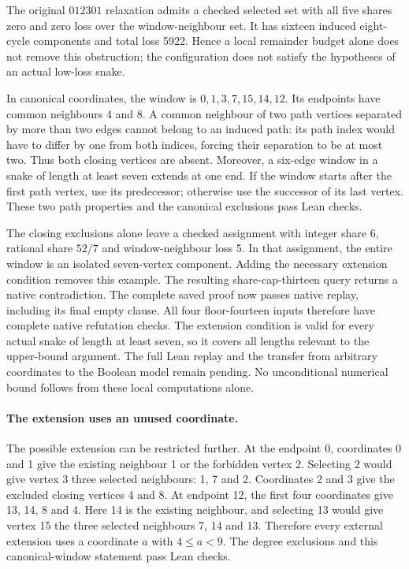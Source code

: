 \documentclass[11pt,a4paper]{article}
\theoremstyle{definition}
\theoremstyle{remark}
\begin{document}
The original $012301$ relaxation admits a checked selected set with all
five shares zero and zero loss over the window-neighbour set. It has
sixteen induced eight-cycle components and total loss 5922. Hence a
local remainder budget alone does not remove this obstruction; the
configuration does not satisfy the hypotheses of an actual low-loss snake.

In canonical coordinates, the window is $0,1,3,7,15,14,12$. Its endpoints
have common neighbours 4 and 8. A common neighbour of two path vertices
separated by more than two edges cannot belong to an induced path:
its path index would have to differ by one from both indices, forcing
their separation to be at most two. Thus both closing vertices are absent.
Moreover, a six-edge window in a snake of length at least seven extends
at one end. If the window starts after the first path vertex, use its
predecessor; otherwise use the successor of its last vertex. These
two path properties and the canonical exclusions pass Lean checks.

The closing exclusions alone leave a checked assignment with integer
share 6, rational share $52/7$ and window-neighbour loss 5. In that
assignment, the entire window is an isolated seven-vertex component.
Adding the necessary extension condition removes this example. The
resulting share-cap-thirteen query returns a native contradiction.
The complete saved proof now passes native replay, including its final
empty clause. All four floor-fourteen inputs therefore have complete
native refutation checks.
The extension condition is valid for every actual snake of length at
least seven, so it covers all lengths relevant to the upper-bound argument.
The full Lean replay and the transfer from arbitrary coordinates to the
Boolean model remain pending. No unconditional numerical bound follows
from these local computations alone.

\paragraph{The extension uses an unused coordinate.}
The possible extension can be restricted further. At the endpoint 0,
coordinates 0 and 1 give the existing neighbour 1 or the forbidden vertex 2.
Selecting 2 would give vertex 3 three selected neighbours: 1, 7 and 2.
Coordinates 2 and 3 give the excluded closing vertices 4 and 8.
At endpoint 12, the first four coordinates give 13, 14, 8 and 4.
Here 14 is the existing neighbour, and selecting 13 would give vertex 15
the three selected neighbours 7, 14 and 13. Therefore every external
extension uses a coordinate $a$ with $4\le a<9$.
The degree exclusions and this canonical-window statement pass Lean checks.
\end{document}
